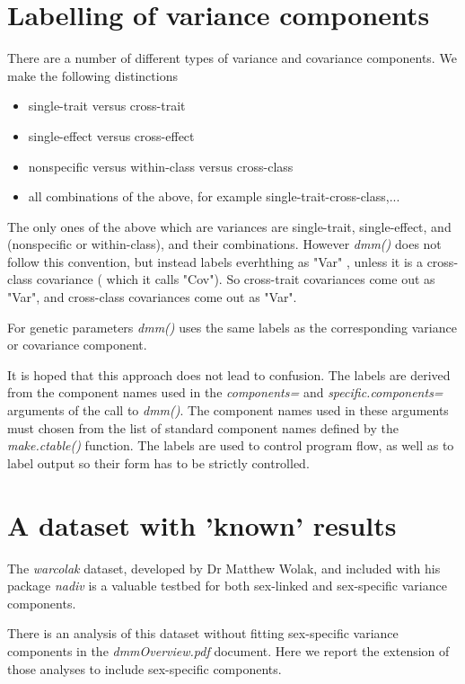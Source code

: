 \documentclass[titlepage]{article}  %
\begin{document}
\section{Labelling of variance components}
	There are a number  of different types of variance and covariance components. We make the following distinctions
\begin{itemize}
\item single-trait versus cross-trait
\item single-effect versus cross-effect
\item nonspecific versus within-class versus cross-class
\item all combinations of the above, for example single-trait-cross-class,...
\end{itemize}
The only ones of the above which are variances are single-trait, single-effect, and (nonspecific or within-class), and their combinations. However {\em dmm()} does not follow this convention, but instead labels everhthing as "Var" , unless it is a cross-class covariance ( which it calls "Cov"). So cross-trait covariances come out as "Var", and cross-class covariances come out as "Var".

For genetic parameters {\em dmm()} uses the same labels as the corresponding variance or covariance component. 

It is hoped that this approach does not lead to confusion. The labels are derived from the component names used in the {\em components=} and {\em specific.components=} arguments of the call to {\em dmm()}. The component names used in these arguments must chosen from the list of standard component names defined by the {\em make.ctable()} function. The labels are used to control program flow, as well as to label output so their form has to be strictly controlled.


\section{A dataset with 'known' results}
The {\em warcolak} dataset, developed by Dr Matthew Wolak, and included with his package {\em nadiv} is a valuable testbed for both sex-linked and sex-specific variance components.
 
There is an analysis of this dataset without fitting sex-specific variance components in the {\em dmmOverview.pdf} document. Here we report the extension of those analyses to include sex-specific components.
\end{document}
